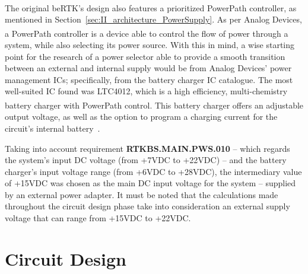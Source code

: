 The original beRTK\textsuperscript{\textregistered}'s design also features a prioritized PowerPath\textsuperscript{\texttrademark} controller, as mentioned in Section~\ref{sec:II_architecture_PowerSupply}.
As per Analog Devices, a PowerPath\textsuperscript{\texttrademark} controller is a device able to control the flow of power through a system, while also selecting its power source.
With this in mind, a wise starting point for the research of a power selector able to provide a smooth transition between an external and internal supply would be from Analog Devices' power management ICs; specifically, from the battery charger IC catalogue. The most well-suited IC found was LTC4012, which is a high efficiency, multi-chemistry battery charger with PowerPath\textsuperscript{\texttrademark} control. This battery charger offers an adjustable output voltage, as well as the option to program a charging current for the circuit's internal battery~\cite{LTC4012}.

Taking into account requirement \textbf{RTKBS.MAIN.PWS.010} -- which regards the system's input \gls{DC} voltage (from +7VDC to +22VDC) -- and the battery charger's input voltage range (from +6VDC to +28VDC), the intermediary value of +15VDC was chosen as the main DC input voltage for the system -- supplied by an external power adapter. It must be noted that the calculations made throughout the circuit design phase take into consideration an external supply voltage that can range from +15VDC to +22VDC.



\section{Circuit Design}\label{sec:33_Circuit}


